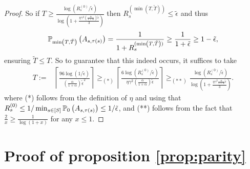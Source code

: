 \documentclass{article}
\theoremstyle{plain}
\theoremstyle{definition}
\theoremstyle{remark}
\begin{document}
\begin{proof}
    So if $T \geq \frac{\log\left(R^{(0)}_s / \tilde \epsilon\right)}{\log\left(1 + \frac{\eta \gamma^2 \left(\frac{\alpha}{1+\alpha}\right) \tilde \epsilon}{3} \right)}$ then $R_s^{(\min\left(T, \tilde T\right))} \leq \tilde \epsilon$ and thus 
    \begin{align*}
    \P_{\min\left(T, \tilde T\right)}\left(A_{s, \tau(s)}\right) = \frac{1}{1 + R_s^{(\min\left(T, \tilde T\right))}} \geq \frac{1}{1+\tilde \epsilon} \geq 1-\tilde \epsilon,
    \end{align*}
    ensuring $\tilde T \leq T$. So to guarantee that this indeed occurs,  it suffices to take 
    \begin{align*}
        T := &\left \lceil \frac{96 \log\left(1 / \tilde \epsilon\right)}{\left(\frac{\alpha}{1+\alpha}\right) \tilde \epsilon^2 } \right\rceil 
        \geq_{(*)} \left \lceil \frac{6\log\left(R^{(0)}_s / \tilde \epsilon\right)}{\eta \gamma^2 \left(\frac{\alpha}{1+\alpha}\right) \tilde \epsilon}\right \rceil 
        \geq_{(**)} \frac{\log\left(R^{(0)}_s / \tilde \epsilon\right)}{\log\left(1 + \frac{\eta \gamma^2 \frac{\alpha}{1+\alpha} \tilde \epsilon}{3} \right)}.
    \end{align*}
    where (*) follows from the definition of $\eta$ and using that $R_s^{(0)} \leq 1 / \min_{s \in [S]} \P_0\left(A_{s, \tau(s)}\right) \leq 1 / \tilde \epsilon$, and (**) follows from the fact that $\frac{2}{x} \geq \frac{1}{\log\left(1+x\right)}$ for any $x\leq 1$.
\end{proof}


\section{Proof of proposition \ref{prop:parity}}\label{proof:parity}
\end{document}
